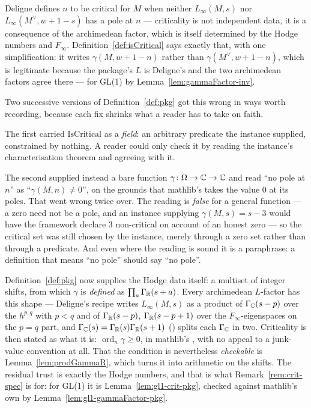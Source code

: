 \begin{remark}
  \label{rem:isCritical-derived}
  Deligne defines $n$ to be critical for $M$ when neither $L_{\infty}(M,s)$ nor
  $L_{\infty}(M^{\vee},w+1-s)$ has a pole at $n$ --- criticality is not independent data, it is a
  consequence of the archimedean factor, which is itself determined by the Hodge numbers and
  $F_{\infty}$. Definition~\ref{def:isCritical} says exactly that, with one simplification:
  it writes $\gamma(M,w+1-n)$ rather than $\gamma(M^{\vee},w+1-n)$, which is legitimate because
  the package's $L$ is Deligne's and the two archimedean factors agree there --- for GL(1) by
  Lemma~\ref{lem:gammaFactor-inv}.

  Two successive versions of Definition~\ref{def:pkg} got this wrong in ways worth recording,
  because each fix shrinks what a reader has to take on faith.

  The first carried $\mathrm{IsCritical}$ as a \emph{field}: an arbitrary predicate the instance
  supplied, constrained by nothing. A reader could only check it by reading the instance's
  characterisation theorem and agreeing with it.

  The second supplied instead a bare function $\gamma \colon \Omega \to \mathbb{C} \to \mathbb{C}$ and read ``no
  pole at $n$'' as ``$\gamma(M,n) \neq 0$'', on the grounds that mathlib's 
  takes the value $0$ at its poles. That went wrong twice over. The reading is \emph{false} for a
  general function --- a zero need not be a pole, and an instance supplying $\gamma(M,s) = s-3$
  would have the framework declare $3$ non-critical on account of an honest zero --- so the
  critical set was still chosen by the instance, merely through a zero set rather than through a
  predicate. And even where the reading is sound it is a paraphrase: a definition that means
  ``no pole'' should say ``no pole''.

  Definition~\ref{def:pkg} now supplies the Hodge data itself: a multiset of integer shifts,
  from which $\gamma$ is \emph{defined} as $\prod_a \Gamma_{\mathbb{R}}(s+a)$. Every archimedean
  $L$-factor has this shape --- Deligne's recipe writes $L_{\infty}(M,s)$ as a product of
  $\Gamma_{\mathbb{C}}(s-p)$ over the $h^{p,q}$ with $p<q$ and of $\Gamma_{\mathbb{R}}(s-p)$,
  $\Gamma_{\mathbb{R}}(s-p+1)$ over the $F_{\infty}$-eigenspaces on the $p=q$ part, and
  $\Gamma_{\mathbb{C}}(s) = \Gamma_{\mathbb{R}}(s)\Gamma_{\mathbb{R}}(s+1)$
  () splits each $\Gamma_{\mathbb{C}}$ in two. Criticality
  is then stated as what it is: $\operatorname{ord}_{n}\gamma \geq 0$, in mathlib's
  , with no appeal to a junk-value convention at all. That the
  condition is nevertheless \emph{checkable} is Lemma~\ref{lem:prodGammaR}, which turns it into
  arithmetic on the shifts.
  The residual trust is exactly the Hodge numbers, and that is what Remark~\ref{rem:crit-spec} is
  for: for GL(1) it is Lemma~\ref{lem:gl1-crit-pkg}, checked against mathlib's own
   by Lemma~\ref{lem:gl1-gammaFactor-pkg}.
\end{remark}

